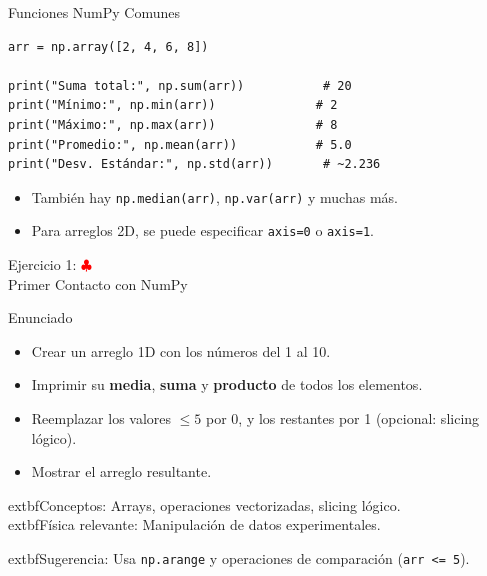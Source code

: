 \documentclass[10pt]{beamer}
\begin{document}
\begin{frame}[fragile]{Funciones NumPy Comunes}
\begin{verbatim}
arr = np.array([2, 4, 6, 8])

print("Suma total:", np.sum(arr))           # 20
print("Mínimo:", np.min(arr))              # 2
print("Máximo:", np.max(arr))              # 8
print("Promedio:", np.mean(arr))           # 5.0
print("Desv. Estándar:", np.std(arr))       # ~2.236
\end{verbatim}
\begin{itemize}
  \item También hay \texttt{np.median(arr)}, \texttt{np.var(arr)} y muchas más.
  \item Para arreglos 2D, se puede especificar \texttt{axis=0} o \texttt{axis=1}.
\end{itemize}
\end{frame}

\begin{frame}{Ejercicio 1: \hfill \textcolor{red}{$\clubsuit$} \\ Primer Contacto con NumPy}
  \begin{block}{Enunciado}
    \begin{itemize}
      \item Crear un arreglo 1D con los números del 1 al 10.
      \item Imprimir su \textbf{media}, \textbf{suma} y \textbf{producto} de todos los elementos.
      \item Reemplazar los valores $\leq 5$ por 0, y los restantes por 1 (opcional: slicing lógico).
      \item Mostrar el arreglo resultante.
    \end{itemize}
  \end{block}
  	extbf{Conceptos:} Arrays, operaciones vectorizadas, slicing lógico.\\
  	extbf{Física relevante:} Manipulación de datos experimentales.
  
  	extbf{Sugerencia}: Usa \texttt{np.arange} y operaciones de comparación (\texttt{arr <= 5}).
\end{frame}
\end{document}
